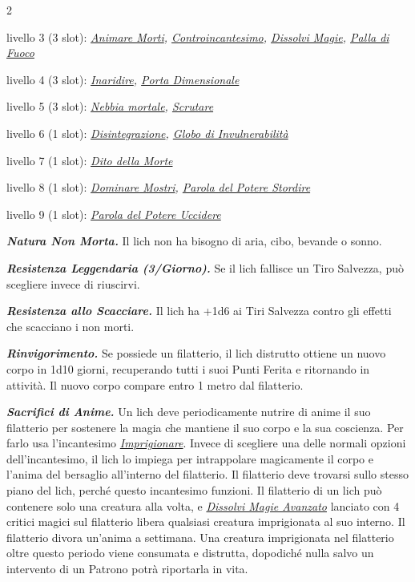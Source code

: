\begin{multicols}{2}
{livello 3 (3 slot): \emph{\hyperlink{Animare Morti}{Animare Morti}, \hyperlink{Controincantesimo}{Controincantesimo}, \hyperlink{Dissolvi Magie}{Dissolvi Magie}, \hyperlink{Palla di Fuoco}{Palla di Fuoco}}

livello 4 (3 slot): \emph{\hyperlink{Inaridire}{Inaridire}, \hyperlink{Porta Dimensionale}{Porta Dimensionale}}

livello 5 (3 slot): \emph{\hyperlink{Nebbia mortale}{Nebbia mortale}, \hyperlink{Scrutare}{Scrutare}}

livello 6 (1 slot): \emph{\hyperlink{Disintegrazione}{Disintegrazione}, \hyperlink{Globo di Invulnerabilità}{Globo di Invulnerabilità}}

livello 7 (1 slot): \emph{\hyperlink{Dito della Morte}{Dito della Morte}}

livello 8 (1 slot): \emph{\hyperlink{Dominare Mostri}{Dominare Mostri}, \hyperlink{Parola del Potere Stordire}{Parola del Potere Stordire}}

livello 9 (1 slot): \emph{\hyperlink{Parola del Potere Uccidere}{Parola del Potere Uccidere}}

\emph{\textbf{Natura Non Morta.}} Il lich non ha bisogno di aria, cibo, bevande o sonno.

\emph{\textbf{Resistenza Leggendaria (3/Giorno).}} Se il lich fallisce un Tiro Salvezza, può scegliere invece di riuscirvi.

\emph{\textbf{Resistenza allo Scacciare.}} Il lich ha +1d6 ai Tiri Salvezza contro gli effetti che scacciano i non morti.

\emph{\textbf{Rinvigorimento.}} Se possiede un filatterio, il lich distrutto ottiene un nuovo corpo in 1d10 giorni, recuperando tutti i suoi Punti Ferita e ritornando in attività. Il nuovo corpo compare entro 1 metro dal filatterio.

\emph{\textbf{Sacrifici di Anime.}} Un lich deve periodicamente nutrire di anime il suo filatterio per sostenere la magia che mantiene il suo corpo e la sua coscienza. Per farlo usa l'incantesimo \emph{\hyperlink{Imprigionare}{Imprigionare}}. Invece di scegliere una delle normali opzioni dell'incantesimo, il lich lo impiega per intrappolare magicamente il corpo e l'anima del bersaglio all'interno del filatterio. Il filatterio deve trovarsi sullo stesso piano del lich, perché questo incantesimo funzioni. Il filatterio di un lich può contenere solo una creatura alla volta, e \emph{\hyperlink{Dissolvi Magie Avanzato}{Dissolvi Magie Avanzato}} lanciato con 4 critici magici sul filatterio libera qualsiasi creatura imprigionata al suo interno. Il filatterio divora un'anima a settimana. Una creatura imprigionata nel filatterio oltre questo periodo viene consumata e distrutta, dopodiché nulla salvo un intervento di un Patrono potrà riportarla in vita.

}
\end{multicols}
